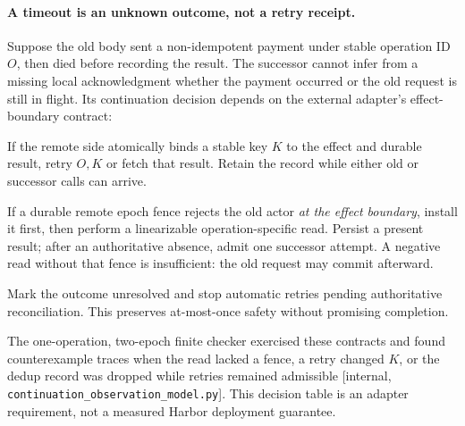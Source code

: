 \documentclass[11pt,a4paper]{article}
\theoremstyle{definition}
\begin{document}
\paragraph{A timeout is an unknown outcome, not a retry receipt.}\label{sec:stp-unknown-effect}
Suppose the old body sent a non-idempotent payment under stable operation ID
$O$, then died before recording the result. The successor cannot infer from a
missing local acknowledgment whether the payment occurred or the old request
is still in flight. Its continuation decision depends on the external
adapter's effect-boundary contract:
\begin{description}[leftmargin=1.8em,itemsep=2pt]
  \item[Atomic deduplication and result.] If the remote side atomically binds
  a stable key $K$ to the effect and durable result, retry $O,K$ or fetch that
  result. Retain the record while either old or successor calls can arrive.
  \item[Ordered readback and fence.] If a durable remote epoch fence rejects
  the old actor \emph{at the effect boundary}, install it first, then perform a
  linearizable operation-specific read. Persist a present result; after an
  authoritative absence, admit one successor attempt. A negative read without
  that fence is insufficient: the old request may commit afterward.
  \item[Neither contract.] Mark the outcome unresolved and stop automatic
  retries pending authoritative reconciliation. This preserves at-most-once
  safety without promising completion.
\end{description}
The one-operation, two-epoch finite checker exercised these contracts and
found counterexample traces when the read lacked a fence, a retry changed
$K$, or the dedup record was dropped while retries remained admissible
[internal, \texttt{continuation\_observation\_model.py}]. This decision table
is an adapter requirement, not a measured Harbor deployment guarantee.
\end{document}
